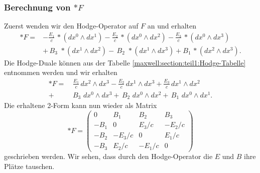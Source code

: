 \subsubsection{Berechnung von $\ast F$}
Zuerst wenden wir den Hodge-Operator auf $F$ an und erhalten
\begin{align*}
	\ast F =
	& - \frac{E_{1}}{c} \, {\ast}(dx^0 \wedge dx^1) - \frac{E_{2}}{c} \, {\ast}(dx^0 \wedge dx^2) - \frac{E_{3}}{c} \, {\ast}(dx^0 \wedge dx^3) \\
	& + \, B_3 \, \, {\ast}(dx^1 \wedge dx^2) - \, B_2 \, \, {\ast}(dx^1 \wedge dx^3) + B_1 \, {\ast}(dx^2 \wedge dx^3).
\end{align*}
Die Hodge-Duale können aus der Tabelle \ref{maxwell:section:teil1:Hodge-Tabelle} entnommen werden und wir erhalten
\begin{align*}
	\ast F =
	& \, \frac{E_{1}}{c} \, dx^2 \wedge dx^3 - \frac{E_{2}}{c} \, dx^1 \wedge dx^3 + \frac{E_{3}}{c} \, dx^1 \wedge dx^2 \\
	 + & \, B_3 \, \, dx^0 \wedge dx^3 + \, B_2 \, \, dx^0 \wedge dx^2 + \, B_1 \, \, dx^0 \wedge dx^1.
\end{align*}
Die erhaltene 2-Form kann nun wieder als Matrix
\begin{equation}
	\ast F = \begin{pmatrix}
		0 & B_1 & B_2 & B_3 \\ -B_1 & 0 & E_3/c & -E_2/c \\ -B_2 & -E_3/c & 0 & E_1/c \\ -B_3 & E_2/c & -E_1/c & 0 
	\end{pmatrix}
\end{equation}
geschrieben werden.
Wir sehen, dass durch den Hodge-Operator die $E$ und $B$ ihre Plätze tauschen.

